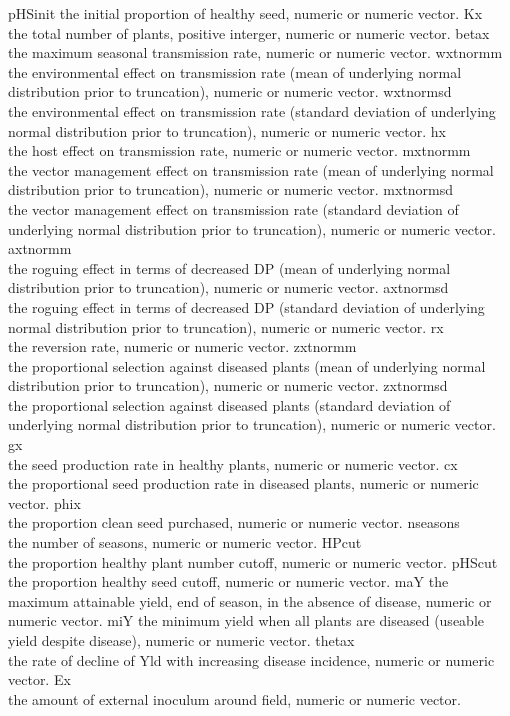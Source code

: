 \documentclass[]{article}
\begin{document}
pHSinit the initial proportion of healthy seed, numeric or numeric
vector. Kx\\
the total number of plants, positive interger, numeric or numeric
vector. betax\\
the maximum seasonal transmission rate, numeric or numeric vector.
wxtnormm\\
the environmental effect on transmission rate (mean of underlying normal
distribution prior to truncation), numeric or numeric vector.
wxtnormsd\\
the environmental effect on transmission rate (standard deviation of
underlying normal distribution prior to truncation), numeric or numeric
vector. hx\\
the host effect on transmission rate, numeric or numeric vector.
mxtnormm\\
the vector management effect on transmission rate (mean of underlying
normal distribution prior to truncation), numeric or numeric vector.
mxtnormsd\\
the vector management effect on transmission rate (standard deviation of
underlying normal distribution prior to truncation), numeric or numeric
vector. axtnormm\\
the roguing effect in terms of decreased DP (mean of underlying normal
distribution prior to truncation), numeric or numeric vector.
axtnormsd\\
the roguing effect in terms of decreased DP (standard deviation of
underlying normal distribution prior to truncation), numeric or numeric
vector. rx\\
the reversion rate, numeric or numeric vector. zxtnormm\\
the proportional selection against diseased plants (mean of underlying
normal distribution prior to truncation), numeric or numeric vector.
zxtnormsd\\
the proportional selection against diseased plants (standard deviation
of underlying normal distribution prior to truncation), numeric or
numeric vector. gx\\
the seed production rate in healthy plants, numeric or numeric vector.
cx\\
the proportional seed production rate in diseased plants, numeric or
numeric vector. phix\\
the proportion clean seed purchased, numeric or numeric vector.
nseasons\\
the number of seasons, numeric or numeric vector. HPcut\\
the proportion healthy plant number cutoff, numeric or numeric vector.
pHScut\\
the proportion healthy seed cutoff, numeric or numeric vector. maY the
maximum attainable yield, end of season, in the absence of disease,
numeric or numeric vector. miY the minimum yield when all plants are
diseased (useable yield despite disease), numeric or numeric vector.
thetax\\
the rate of decline of Yld with increasing disease incidence, numeric or
numeric vector. Ex\\
the amount of external inoculum around field, numeric or numeric vector.
\end{document}
